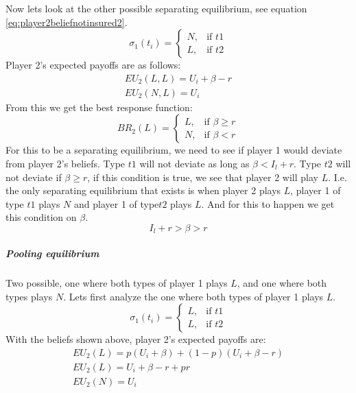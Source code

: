 Now lets look at the other possible separating equilibrium, see equation \ref{eq:player2beliefnotinsured2}.
\begin{equation}
    \sigma_{1}(t_{i})= 
\begin{cases}
   N,& \text{if } t1\\
   L,& \text{if } t2  
\end{cases}
\label{eq:player2beliefnotinsured2}
\end{equation}
Player 2's expected payoffs are as follows:
\begin{eqnarray}
EU_{2}(L,L)=U_{i}+\beta-r \\
EU_{2}(N,L)=U_{i}
\end{eqnarray}
From this we get the best response function:
\begin{equation}
BR_{2}(L)=
\begin{cases}
L ,& \text{if } \beta\geq r \\
N ,& \text{if } \beta<r 
\end{cases}
\end{equation}
For this to be a separating equilibrium, we need to see if player 1 would deviate from player 2's beliefs. 
Type $t1$ will not deviate as long as $\beta<I_{l}+r$. Type $t2$ will not deviate if $\beta \geq r$, if this condition is true, we see that player 2 will play $L$. I.e. the only separating equilibrium that exists is when player 2 plays $L$, player 1 of type $t1$ plays $N$ and player 1 of type$t2$ plays $L$.
And for this to happen we get this condition on $\beta$. \begin{equation}
I_{l}+r>\beta>r
\label{eq:conditionseparatingequilibrium}
\end{equation}
\subparagraph{Pooling equilibrium}
Two possible, one where both types of player 1 plays $L$, and one where both types plays $N$. Lets first analyze the one where both types of player 1 plays $L$.
\begin{equation}
    \sigma_{1}(t_{i})= 
\begin{cases}
   L,& \text{if } t1\\
   L,& \text{if } t2  
\end{cases}
\label{eq:player2beliefnotinsuredpooling}
\end{equation}
With the beliefs shown above, player 2's expected payoffs are: \begin{eqnarray}
EU_{2}(L)=p(U_{i}+\beta)+(1-p)(U_{i}+\beta-r) \nonumber \\
EU_{2}(L)=U_{i}+\beta-r+pr \\
EU_{2}(N)=U_{i}
\end{eqnarray}
